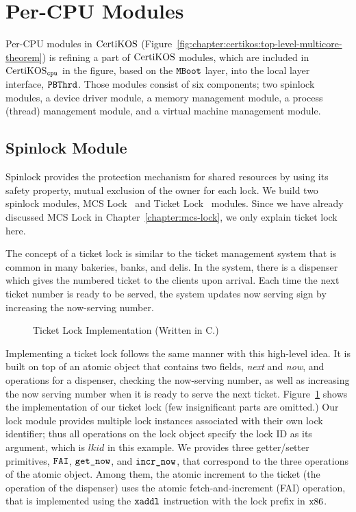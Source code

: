 \section{Per-CPU Modules}
\label{chapter:certikos:sec:per-cpu-modules}

Per-CPU modules in $\mathrm{CertiKOS}$ (Figure~\ref{fig:chapter:certikos:top-level-multicore-theorem}) is refining a part of $\mathrm{CertiKOS}$ modules,
which are included in $\mathrm{CertiKOS}_{{\mathrm{\texttt{cpu}}}}$ in the figure, based on the ${\mathrm{\texttt{MBoot}}}$ layer, 
into the local layer interface, ${\mathrm{\texttt{PBThrd}}}$.
Those modules consist of six components;
two spinlock modules, a device driver module, a memory management module,  a process (thread) management module, and a virtual machine management module. 

\subsection{Spinlock Module}
\label{chapter:certikos:subsec:spinlock-module}

Spinlock provides the protection mechanism for shared resources by using its safety property, mutual exclusion of the owner for each lock. 
We build two spinlock modules, 
MCS Lock~\cite{mcs91} and Ticket Lock~\cite{lwn:ticketlocks} modules.
Since we have already discussed MCS Lock in Chapter~\ref{chapter:mcs-lock}, 
we only explain ticket lock here.

The concept of a ticket lock is similar to the ticket management system that is common in many bakeries, banks, and delis. 
In the system, 
there is a dispenser which gives the numbered ticket to the clients upon arrival. 
Each time the next ticket number is ready to 
be served, 
the system updates now serving sign by increasing the now-serving number. 
\begin{figure}
 
\caption{Ticket Lock Implementation (Written in C.)}
\label{fig:chapter:certikos:ticket-lock-example}
\end{figure}
Implementing a ticket lock follows the same manner with this high-level idea.
It is built on top of an atomic object that contains two fields, \textit{next} and \textit{now},
and operations for a dispenser, checking the now-serving number, as well as increasing the now serving number when
it is ready to serve the next ticket. 
Figure~\ref{fig:chapter:certikos:ticket-lock-example} shows the implementation of our ticket lock (few insignificant parts are omitted.)
Our lock module provides multiple lock instances associated with their own lock identifier;
thus all operations on the lock object specify the lock ID as its argument, which is $lkid$ in this example.
We provides three getter/setter primitives, ${\mathrm{\texttt{FAI}}}$, ${\mathrm{\texttt{get\_now}}}$, and ${\mathrm{\texttt{incr\_now}}}$,
that correspond to the three operations of the atomic object.
Among them, the atomic increment to the ticket (the operation of the dispenser) 
uses the atomic fetch-and-increment (FAI) operation, that is implemented using the ${\mathrm{\texttt{xaddl}}}$ instruction with the 
lock prefix in $\mathrm{x86}$.

